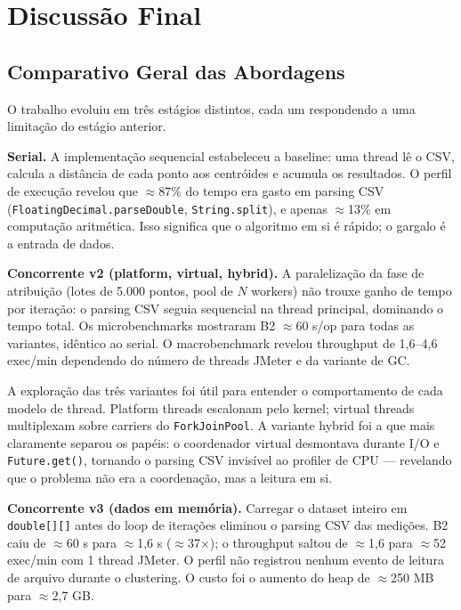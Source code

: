 \section{Discussão Final}

\subsection{Comparativo Geral das Abordagens}

O trabalho evoluiu em três estágios distintos, cada um respondendo a uma limitação
do estágio anterior.

\textbf{Serial.}
A implementação sequencial estabeleceu a baseline: uma thread lê o CSV, calcula a
distância de cada ponto aos centróides e acumula os resultados. O perfil de execução
revelou que $\approx$87\% do tempo era gasto em parsing CSV
(\texttt{FloatingDecimal.parseDouble}, \texttt{String.split}), e apenas $\approx$13\%
em computação aritmética. Isso significa que o algoritmo em si é rápido; o gargalo
é a entrada de dados.

\textbf{Concorrente v2 (platform, virtual, hybrid).}
A paralelização da fase de atribuição (lotes de 5.000 pontos, pool de $N$ workers)
não trouxe ganho de tempo por iteração: o parsing CSV seguia sequencial na thread
principal, dominando o tempo total. Os microbenchmarks mostraram B2
$\approx$60 s/op para todas as variantes, idêntico ao serial. O macrobenchmark
revelou throughput de 1,6--4,6 exec/min dependendo do número de threads JMeter
e da variante de GC.

A exploração das três variantes foi útil para entender o comportamento de cada
modelo de thread. Platform threads escalonam pelo kernel; virtual threads
multiplexam sobre carriers do \texttt{ForkJoinPool}. A variante hybrid foi a que
mais claramente separou os papéis: o coordenador virtual desmontava durante I/O e
\texttt{Future.get()}, tornando o parsing CSV invisível ao profiler de CPU
--- revelando que o problema não era a coordenação, mas a leitura em si.

\textbf{Concorrente v3 (dados em memória).}
Carregar o dataset inteiro em \texttt{double[][]} antes do loop de iterações
eliminou o parsing CSV das medições. B2 caiu de $\approx$60 s para $\approx$1{,}6 s
($\approx$37$\times$); o throughput saltou de $\approx$1,6 para $\approx$52
exec/min com 1 thread JMeter. O perfil não registrou nenhum evento de leitura de
arquivo durante o clustering. O custo foi o aumento do heap de $\approx$250 MB
para $\approx$2{,}7 GB.

